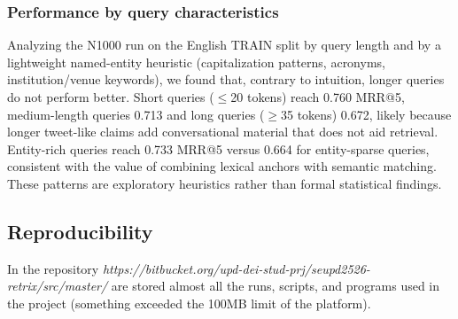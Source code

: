 \subsubsection{Performance by query characteristics}

Analyzing the N1000 run on the English TRAIN split by query length and by a lightweight named-entity heuristic (capitalization patterns, acronyms, institution/venue keywords), we found that, contrary to intuition, longer queries do not perform better. Short queries ($\leq$20 tokens) reach 0.760 MRR@5, medium-length queries 0.713 and long queries ($\geq$35 tokens) 0.672, likely because longer tweet-like claims add conversational material that does not aid retrieval. Entity-rich queries reach 0.733 MRR@5 versus 0.664 for entity-sparse queries, consistent with the value of combining lexical anchors with semantic matching. These patterns are exploratory heuristics rather than formal statistical findings.

\subsection{Reproducibility}
In the repository \textit{https://bitbucket.org/upd-dei-stud-prj/seupd2526-retrix/src/master/} are stored almost all the runs, scripts, and programs used in the project (something exceeded the 100MB limit of the platform).